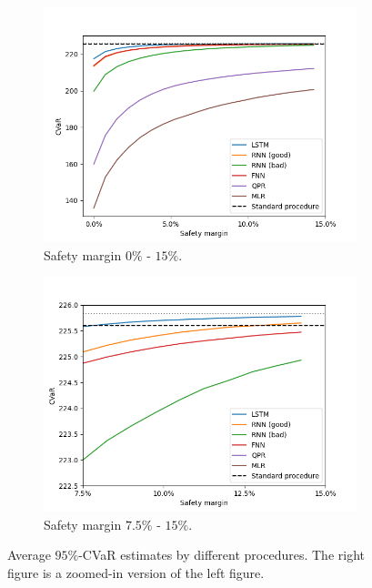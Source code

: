 \begin{figure}[ht!]
    \centering
    \begin{subfigure}{0.48\textwidth}
        \includegraphics[width=\textwidth]{./project2/figures/CVaR/allLN.png}
        \caption{Safety margin $0\%$ - $15\%$.}
        \label{subfig2:AllSafetyMargin}
    \end{subfigure}
    \begin{subfigure}{0.48\textwidth}
        \includegraphics[width=\textwidth]{./project2/figures/CVaR/zoomedLN.png}
        \caption{Safety margin $7.5\%$ - $15\%$.}
        \label{subfig2:ZoomedSafetyMargin}
    \end{subfigure}
    \caption{Average $95\%$-CVaR estimates by different procedures. The right figure is a zoomed-in version of the left figure.} 
    \label{fig2:CVaR95}
\end{figure}

